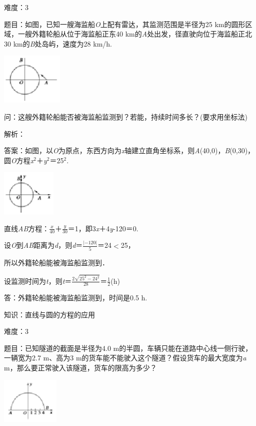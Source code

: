 \documentclass{article} %
\begin{document}
难度：3

题目：如图，已知一艘海监船\textit{O}上配有雷达，其监测范围是半径为25 km的圆形区域，一艘外籍轮船从位于海监船正东40 km的\textit{A}处出发，径直驶向位于海监船正北30 km的\textit{B}处岛屿，速度为28 km/h.

\includegraphics*[width=1.17in, height=0.98in, keepaspectratio=false]{image305}

问：这艘外籍轮船能否被海监船监测到？若能，持续时间多长？(要求用坐标法)

解析：

答案：如图，以\textit{O}为原点，东西方向为\textit{x}轴建立直角坐标系，则\textit{A}(40,0)，\textit{B}(0,30)，圆\textit{O}方程\textit{x}${}^{2}$＋\textit{y}${}^{2}$＝25${}^{2}$.

\includegraphics*[width=1.04in, height=0.87in, keepaspectratio=false]{image306}

直线\textit{AB}方程：$\frac{x}{40}$＋$\frac{y}{30}$＝1，即3\textit{x}＋4\textit{y}-120＝0.

设\textit{O}到\textit{AB}距离为\textit{d}，则\textit{d}＝$\frac{|-120|}{5}$＝24$\mathrm{<}$25，

所以外籍轮船能被海监船监测到．

设监测时间为\textit{t}，则\textit{t}＝$\frac{2\sqrt{25^2-24^2}}{28}$＝$\frac{1}{2}$(h)

答：外籍轮船能被海监船监测到，时间是0.5 h.

知识：直线与圆的方程的应用

难度：3

题目：已知隧道的截面是半径为4.0 m的半圆，车辆只能在道路中心线一侧行驶，一辆宽为2.7 m、高为3 m的货车能不能驶入这个隧道？假设货车的最大宽度为\textit{a} m，那么要正常驶入该隧道，货车的限高为多少？

\includegraphics*[width=1.09in, height=0.88in, keepaspectratio=false]{image307}
\end{document}
